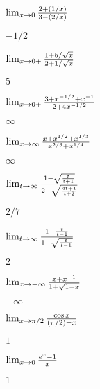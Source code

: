 \begin{exercises}
\begin{exercise} $\lim_{x\to 0}{2+(1/x)\over 3-(2/x)}$
\begin{answer} $-1/2$
\end{answer}\end{exercise}

\begin{exercise} $\lim_{x\to 0+}{1+5/\sqrt{x}\over 2+1/\sqrt{x}}$
\begin{answer} $5$
\end{answer}\end{exercise}

\begin{exercise} $\lim_{x\to 0+}{3+x^{-1/2}+x^{-1}\over 2+4x^{-1/2}}$
\begin{answer} $\infty$
\end{answer}\end{exercise}

\begin{exercise} $\lim_{x\to\infty}{x+x^{1/2}+x^{1/3}\over x^{2/3}+x^{1/4}}$
\begin{answer} $\infty$
\end{answer}\end{exercise}

\begin{exercise} $\lim_{t\to\infty}
{1-\sqrt{t\over t+1}\over 2-\sqrt{4t+1\over t+2}}$
\begin{answer} $2/7$
\end{answer}\end{exercise}

\begin{exercise} $\lim_{t\to\infty}{1-{t\over t-1}\over 1-\sqrt{t\over t-1}}$
\begin{answer} $2$
\end{answer}\end{exercise}

\begin{exercise} $\lim_{x\to-\infty}{x+x^{-1}\over 1+\sqrt{1-x}}$
\begin{answer} $-\infty$
\end{answer}\end{exercise}



\begin{exercise} $\lim_{x\to\pi/2}{\cos x\over (\pi/2)-x}$
\begin{answer} $1$
\end{answer}\end{exercise}

\begin{exercise} $\lim_{x\to0}{e^x-1\over x}$
\begin{answer} $1$
\end{answer}\end{exercise}


\end{exercises}
